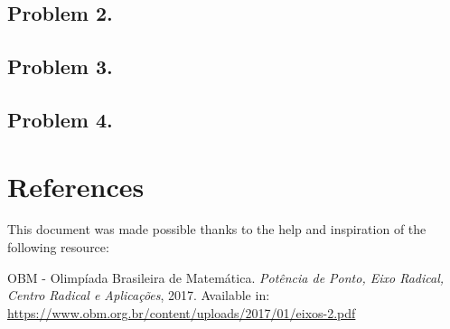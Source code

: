 \documentclass[12pt]{article}
\begin{document}
    \clearpage

    \subsection{Problem 2.}
    
    \clearpage

    \subsection{Problem 3.}

    \clearpage

    \subsection{Problem 4.}

  \clearpage

  \section{\textsf{References}}
    This document was made possible thanks to the help and inspiration of the following resource:
    \renewcommand{\refname}{\vspace{-2em}}
    \begin{thebibliography}{9}
      OBM - Olimpíada Brasileira de Matemática.
      \textit{Potência de Ponto, Eixo Radical, Centro Radical e Aplicações}, 2017.
      Available in: \url{https://www.obm.org.br/content/uploads/2017/01/eixos-2.pdf}
    \end{thebibliography}
\end{document}
